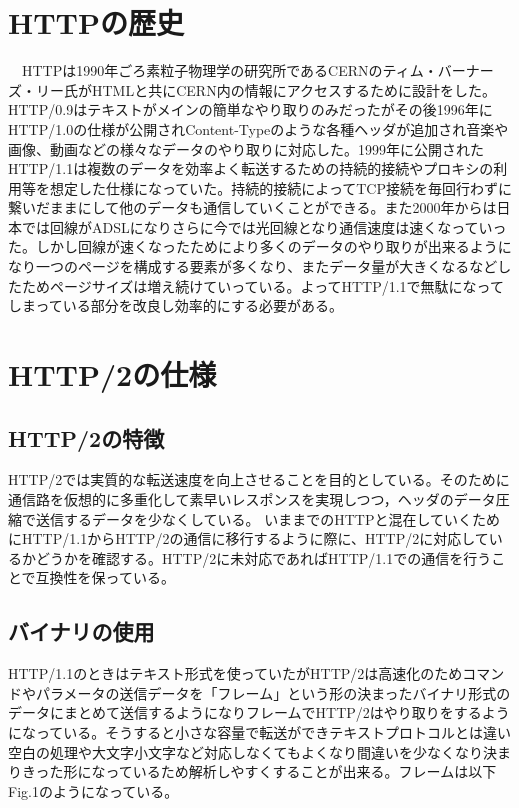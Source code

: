 \documentclass[a4j,9pt,twocolumn]{jsarticle}
\begin{document}
\section{HTTPの歴史}
　HTTPは1990年ごろ素粒子物理学の研究所であるCERNのティム・バーナーズ・リー氏がHTMLと共にCERN内の情報にアクセスするために設計をした。HTTP/0.9はテキストがメインの簡単なやり取りのみだったがその後1996年にHTTP/1.0の仕様が公開されContent-Typeのような各種ヘッダが追加され音楽や画像、動画などの様々なデータのやり取りに対応した。1999年に公開されたHTTP/1.1は複数のデータを効率よく転送するための持続的接続やプロキシの利用等を想定した仕様になっていた。持続的接続によってTCP接続を毎回行わずに繋いだままにして他のデータも通信していくことができる。また2000年からは日本では回線がADSLになりさらに今では光回線となり通信速度は速くなっていった。しかし回線が速くなったためにより多くのデータのやり取りが出来るようになり一つのページを構成する要素が多くなり、またデータ量が大きくなるなどしたためページサイズは増え続けていっている。よってHTTP/1.1で無駄になってしまっている部分を改良し効率的にする必要がある。



\section{HTTP/2の仕様}
\subsection{HTTP/2の特徴}
HTTP/2では実質的な転送速度を向上させることを目的としている。そのために通信路を仮想的に多重化して素早いレスポンスを実現しつつ，ヘッダのデータ圧縮で送信するデータを少なくしている。
いままでのHTTPと混在していくためにHTTP/1.1からHTTP/2の通信に移行するように際に、HTTP/2に対応しているかどうかを確認する。HTTP/2に未対応であればHTTP/1.1での通信を行うことで互換性を保っている。



\subsection{バイナリの使用}
HTTP/1.1のときはテキスト形式を使っていたがHTTP/2は高速化のためコマンドやパラメータの送信データを「フレーム」という形の決まったバイナリ形式のデータにまとめて送信するようになりフレームでHTTP/2はやり取りをするようになっている。そうすると小さな容量で転送ができテキストプロトコルとは違い空白の処理や大文字小文字など対応しなくてもよくなり間違いを少なくなり決まりきった形になっているため解析しやすくすることが出来る。フレームは以下Fig.1のようになっている。
\end{document}

